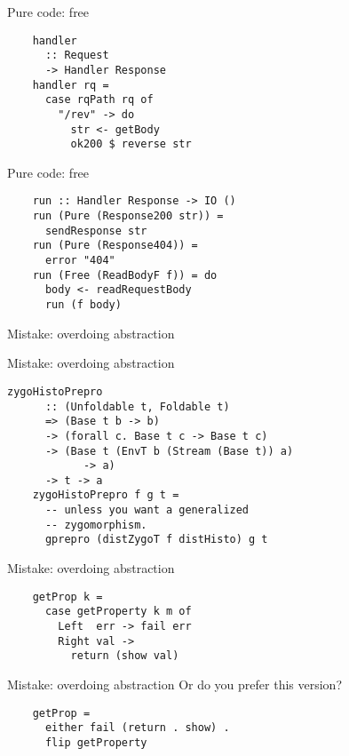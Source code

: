 \documentclass[20pt]{beamer}
\newcommand{\vspaced}{
    \vspace{5mm}
}
\newcommand{\chapterslide}[1]{
    {
        \begin{frame}[plain]
        \begin{center}
        \large{#1}
        \end{center}
        \end{frame}
    }
}
\begin{document}
\begin{frame}[fragile]{Pure code: free}
    \begin{lstlisting}
    handler
      :: Request
      -> Handler Response
    handler rq =
      case rqPath rq of
        "/rev" -> do
          str <- getBody
          ok200 $ reverse str
    \end{lstlisting}
\end{frame}

\begin{frame}[fragile]{Pure code: free}
    \begin{lstlisting}
    run :: Handler Response -> IO ()
    run (Pure (Response200 str)) =
      sendResponse str
    run (Pure (Response404)) =
      error "404"
    run (Free (ReadBodyF f)) = do
      body <- readRequestBody
      run (f body)
    \end{lstlisting}
\end{frame}


\chapterslide{Mistake: overdoing abstraction}

\begin{frame}[fragile]{Mistake: overdoing abstraction}
    \begin{lstlisting}[basicstyle=\ttfamily\footnotesize]
    zygoHistoPrepro
      :: (Unfoldable t, Foldable t)
      => (Base t b -> b)
      -> (forall c. Base t c -> Base t c)
      -> (Base t (EnvT b (Stream (Base t)) a)
            -> a)
      -> t -> a
    zygoHistoPrepro f g t =
      -- unless you want a generalized
      -- zygomorphism.
      gprepro (distZygoT f distHisto) g t
    \end{lstlisting}
\end{frame}

\begin{frame}[fragile]{Mistake: overdoing abstraction}
    \begin{lstlisting}
    getProp k =
      case getProperty k m of
        Left  err -> fail err
        Right val ->
          return (show val)
    \end{lstlisting}
\end{frame}

\begin{frame}[fragile]{Mistake: overdoing abstraction}
    Or do you prefer this version? \\
    \vspaced
    \begin{lstlisting}
    getProp =
      either fail (return . show) .
      flip getProperty
    \end{lstlisting}
\end{frame}
\end{document}
